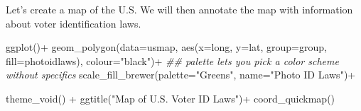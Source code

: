 \documentclass[
  letterpaper,
  DIV=11,
  numbers=noendperiod]{scrreprt}
\newenvironment{Shaded}{\begin{snugshade}}{\end{snugshade}}
\newcommand{\AttributeTok}[1]{\textcolor[rgb]{0.40,0.45,0.13}{#1}}
\newcommand{\DocumentationTok}[1]{\textcolor[rgb]{0.37,0.37,0.37}{\textit{#1}}}
\newcommand{\FunctionTok}[1]{\textcolor[rgb]{0.28,0.35,0.67}{#1}}
\newcommand{\NormalTok}[1]{\textcolor[rgb]{0.00,0.23,0.31}{#1}}
\newcommand{\OtherTok}[1]{\textcolor[rgb]{0.00,0.23,0.31}{#1}}
\newcommand{\SpecialCharTok}[1]{\textcolor[rgb]{0.37,0.37,0.37}{#1}}
\newcommand{\StringTok}[1]{\textcolor[rgb]{0.13,0.47,0.30}{#1}}
\begin{document}
\begin{Shaded}
\end{Shaded}

Let's create a map of the U.S. We will then annotate the map with
information about voter identification laws.

\begin{Shaded}
\begin{Highlighting}[]
\FunctionTok{ggplot}\NormalTok{()}\SpecialCharTok{+}
  \FunctionTok{geom\_polygon}\NormalTok{(}\AttributeTok{data=}\NormalTok{usmap, }\FunctionTok{aes}\NormalTok{(}\AttributeTok{x=}\NormalTok{long, }\AttributeTok{y=}\NormalTok{lat, }\AttributeTok{group=}\NormalTok{group, }
                               \AttributeTok{fill=}\NormalTok{photoidlaws),}
               \AttributeTok{colour=}\StringTok{"black"}\NormalTok{)}\SpecialCharTok{+}
  \DocumentationTok{\#\# palette lets you pick a color scheme without specifics}
  \FunctionTok{scale\_fill\_brewer}\NormalTok{(}\AttributeTok{palette=}\StringTok{"Greens"}\NormalTok{, }\AttributeTok{name=}\StringTok{"Photo ID Laws"}\NormalTok{)}\SpecialCharTok{+}

  \FunctionTok{theme\_void}\NormalTok{() }\SpecialCharTok{+}
  \FunctionTok{ggtitle}\NormalTok{(}\StringTok{"Map of U.S. Voter ID Laws"}\NormalTok{)}\SpecialCharTok{+}
  \FunctionTok{coord\_quickmap}\NormalTok{()}
\end{Highlighting}
\end{Shaded}
\end{document}
